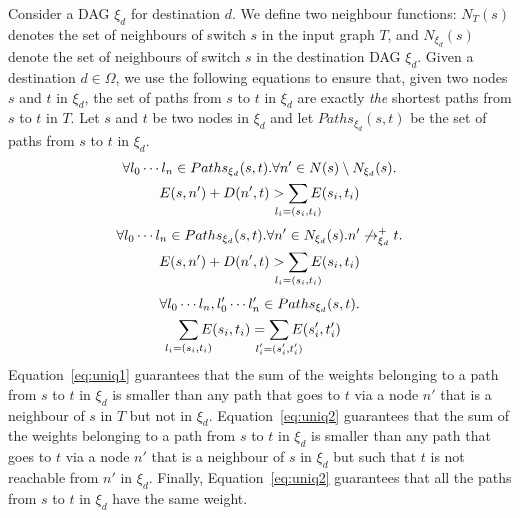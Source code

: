 Consider a DAG $\xi_d$ for destination $d$. We define two neighbour
functions: $N_T(s)$ denotes the set of neighbours of switch $s$ 
in the input graph $T$, and $N_{\xi_d}(s)$ denote the set of
neighbours of switch $s$ in the destination DAG $\xi_d$. 
Given a destination $d\in \Omega$,
we use the following equations to ensure that, given two nodes $s$ and $t$ in
$\xi_d$, 
the set of paths from $s$ to $t$ in $\xi_d$ are
exactly
\emph{the} shortest paths from $s$ to $t$ in $T$.
Let $s$ and $t$ be two nodes in $\xi_d$ and let  $Paths_{\xi_d}(s,t)$ be the set of paths from $s$ to $t$ in $\xi_d$.
\begin{multline} \label{eq:uniq1}
		\forall l_0\cdots l_n\in Paths_{\xi_d}(s,t).
		\forall n' \in N(s) \setminus N_{\xi_d}(s). \\
		E(s, n') + D(n', t) > \sum_{\mathclap{\substack{l_i=(s_i,t_i)}}} 
		E(s_i, t_i) 
\end{multline}
\begin{multline} \label{eq:uniq2}
		\forall l_0\cdots l_n\in Paths_{\xi_d}(s,t).
		\forall n' \in N_{\xi_d}(s). n' \not\rightarrow^+_{\xi_d} t.  \\
		E(s, n') + D(n', t) > \sum_{\mathclap{\substack{l_i=(s_i,t_i)}}} 
		E(s_i, t_i) 
\end{multline}
\vspace{-2mm}
\begin{multline} \label{eq:uniq3}
		\forall l_0\cdots l_n, l_0'\cdots l_n'\in Paths_{\xi_d}(s,t).\\
		\sum_{\mathclap{\substack{l_i=(s_i,t_i)}}} 
		E(s_i, t_i)  =\sum_{\mathclap{\substack{l_i'=(s_i',t_i')}}} 
		E(s_i', t_i') 
\end{multline}
Equation~\ref{eq:uniq1} guarantees that 
the sum of the weights belonging to a path from $s$ to $t$ in $\xi_d$ is smaller than 
any path that goes to $t$ via a node $n'$ that is a neighbour of $s$ in $T$ but not in $\xi_d$.
Equation~\ref{eq:uniq2} guarantees that
the sum of the weights belonging to a path from $s$ to $t$ in $\xi_d$ is smaller than 
any path that goes to $t$ via a node $n'$ that is a neighbour of $s$ in $\xi_d$ but such that
$t$ is not reachable from $n'$ in $\xi_d$.
Finally, Equation~\ref{eq:uniq2} guarantees that all the paths from $s$ to $t$ in $\xi_d$ have the same weight.
